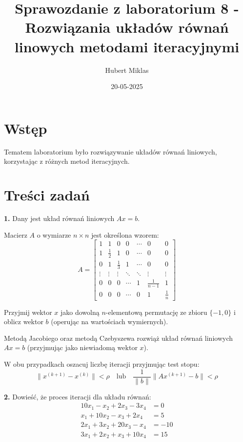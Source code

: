 \documentclass[a4paper,12pt]{article}
\title{Sprawozdanie z laboratorium 8 - Rozwiązania układów równań linowych metodami iteracyjnymi}
\author{Hubert Miklas}
\date{20-05-2025}
\begin{document}
\maketitle

\section{Wstęp}

Tematem laboratorium było rozwiązywanie układów równań liniowych, korzystając z różnych metod iteracyjnych.

\section{Treści zadań}

\textbf{1.} Dany jest układ równań liniowych $Ax = b$.

Macierz $A$ o wymiarze $n \times n$ jest określona wzorem:
\[
A = \begin{bmatrix}
1 & 1 & 0 & 0 & \cdots & 0 & 0 \\
1 & \frac{1}{2} & 1 & 0 & \cdots & 0 & 0 \\
0 & 1 & \frac{1}{3} & 1 & \cdots & 0 & 0 \\
\vdots & \vdots & \vdots & \ddots & \ddots & \vdots & \vdots \\
0 & 0 & 0 & \cdots & 1 & \frac{1}{n-1} & 1 \\
0 & 0 & 0 & \cdots & 0 & 1 & \frac{1}{n}
\end{bmatrix}
\]

Przyjmij wektor $x$ jako dowolną $n$-elementową permutację ze zbioru $\{-1, 0\}$ i oblicz wektor $b$ (operując na wartościach wymiernych).

Metodą Jacobiego oraz metodą Czebyszewa rozwiąż układ równań liniowych $Ax = b$ (przyjmując jako niewiadomą wektor $x$).

W obu przypadkach oszacuj liczbę iteracji przyjmując test stopu:
\[
\|x^{(k+1)} - x^{(k)}\| < \rho
\quad \text{lub} \quad
\frac{1}{\|b\|} \|Ax^{(k+1)} - b\| < \rho
\]

\vspace{1em}
\textbf{2.} Dowieść, że proces iteracji dla układu równań:
\[
\begin{aligned}
10x_1 - x_2 + 2x_3 - 3x_4 &= 0 \\
x_1 + 10x_2 - x_3 + 2x_4 &= 5 \\
2x_1 + 3x_2 + 20x_3 - x_4 &= -10 \\
3x_1 + 2x_2 + x_3 + 10x_4 &= 15
\end{aligned}
\]
\end{document}
